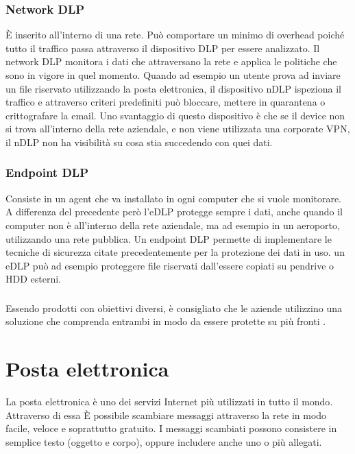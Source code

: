     \subsubsection{Network DLP}
            È inserito all'interno di una rete. Può comportare un minimo di overhead poiché tutto il traffico
            passa attraverso il dispositivo DLP per essere analizzato.
            Il network DLP monitora i dati che attraversano la rete e applica le politiche che sono in vigore
            in quel momento. Quando ad esempio un utente prova ad inviare un file riservato utilizzando la posta
            elettronica, il  dispositivo nDLP ispeziona il traffico e attraverso criteri predefiniti 
            può bloccare, mettere in quarantena o crittografare la email.
            Uno svantaggio di questo dispositivo è che se il device non si trova all'interno della rete aziendale,
            e non viene utilizzata una corporate VPN, il nDLP non ha visibilità su cosa stia succedendo con quei 
            dati.

    \subsubsection{Endpoint DLP}
            Consiste in un agent che va installato in ogni computer che si vuole monitorare. A differenza del precedente 
            però l'eDLP protegge sempre i dati, anche quando il computer non è all'interno della rete aziendale, ma ad esempio in un 
            aeroporto, utilizzando una rete pubblica. Un endpoint DLP permette di implementare le tecniche di sicurezza
            citate precedentemente per la protezione dei dati in uso. un eDLP può ad esempio proteggere file riservati
            dall'essere copiati su pendrive o HDD esterni.
    
    \subsubsection*{}     
    Essendo prodotti con obiettivi diversi, è consigliato che le aziende utilizzino una soluzione che comprenda entrambi
    in modo da essere protette su più fronti \cite{DLP5}.


\pagebreak
\section{Posta elettronica}
La posta elettronica è uno dei servizi Internet più utilizzati in tutto il mondo\cite{posta}. Attraverso di essa
È possibile scambiare messaggi attraverso la rete in modo facile, veloce e soprattutto gratuito. 
I messaggi scambiati possono consistere in semplice testo (oggetto e corpo), 
oppure includere anche uno o più allegati.

